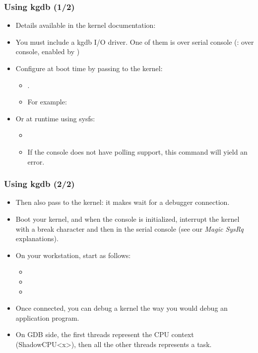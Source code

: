 \begin{frame}
  \frametitle{Using kgdb (1/2)}
  \begin{itemize}
  \item Details available in the kernel documentation:
  \item You must include a kgdb I/O driver. One of them is  over
    serial console (:  over console, enabled by
    )
  \item Configure  at boot time by passing to the kernel:
    \begin{itemize}
    \item {}.
    \item For example: 
    \end{itemize}
  \item Or at runtime using sysfs:
   \begin{itemize}
   \item {}
   \item If the console does not have polling support, this command will yield
         an error.
   \end{itemize}
  \end{itemize}
\end{frame}

\begin{frame}
  \frametitle{Using kgdb (2/2)}
  \begin{itemize}
  \item Then also pass  to the kernel: it makes
     wait for a debugger connection.
  \item Boot your kernel, and when the console is initialized,
    interrupt the kernel with a break character and then 
    in the serial console (see our {\em Magic SysRq} explanations).
  \item On your workstation, start  as follows:
    \begin{itemize}
    \item {}
    \item {}
    \item {}
    \end{itemize}
  \item Once connected, you can debug a kernel the way you would debug
    an application program.
  \item On GDB side, the first threads represent the CPU context (ShadowCPU<x>),
    then all the other threads represents a task.
  \end{itemize}
\end{frame}
